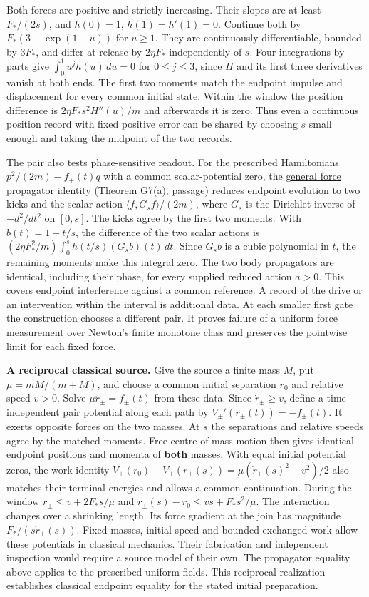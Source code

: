 \documentclass[11pt,a4paper]{article}
\begin{document}
Both forces are positive and strictly increasing. Their slopes are at
least \(F_*/(2s)\), and \(h(0)=1\), \(h(1)=h'(1)=0\). Continue both by
\(F_*(3-\exp(1-u))\) for \(u\ge1\). They are continuously
differentiable, bounded by \(3F_*\), and differ at release by
\(2\eta F_*\) independently of \(s\). Four integrations by parts give
\(\int_0^1u^j h(u)\,du=0\) for \(0\le j\le3\), since \(H\) and its first
three derivatives vanish at both ends. The first two moments match the
endpoint impulse and displacement for every common initial state. Within
the window the position difference is \(2\eta F_*s^2 H''(u)/m\) and
afterwards it is zero. Thus even a continuous position record with fixed
positive error can be shared by choosing \(s\) small enough and taking
the midpoint of the two records.

The pair also tests phase-sensitive readout. For the prescribed
Hamiltonians \(p^2/(2m)-f_\pm(t)q\) with a common scalar-potential zero,
the
\href{cut-measure-newton.md\#general-force-histories-one-dirichlet-functional}{general
force propagator identity} (Theorem G7(a), passage) reduces endpoint
evolution to two kicks and the scalar action
\(\langle f,G_s f\rangle/(2m)\), where \(G_s\) is the Dirichlet inverse
of \(-d^2/dt^2\) on \([0,s]\). The kicks agree by the first two moments.
With \(b(t)=1+t/s\), the difference of the two scalar actions is
\((2\eta F_*^2/m)\int_0^s h(t/s)(G_s b)(t)\,dt\). Since \(G_s b\) is a
cubic polynomial in \(t\), the remaining moments make this integral
zero. The two body propagators are identical, including their phase, for
every supplied reduced action \(a>0\). This covers endpoint interference
against a common reference. A record of the drive or an intervention
within the interval is additional data. At each smaller first gate the
construction chooses a different pair. It proves failure of a uniform
force measurement over Newton's finite monotone class and preserves the
pointwise limit for each fixed force.

\textbf{A reciprocal classical source.} Give the source a finite mass
\(M\), put \(\mu=mM/(m+M)\), and choose a common initial separation
\(r_0\) and relative speed \(v>0\). Solve \(\mu\ddot r_\pm=f_\pm(t)\)
from these data. Since \(\dot r_\pm\ge v\), define a time-independent
pair potential along each path by \(V_\pm'(r_\pm(t))=-f_\pm(t)\). It
exerts opposite forces on the two masses. At \(s\) the separations and
relative speeds agree by the matched moments. Free centre-of-mass motion
then gives identical endpoint positions and momenta of \textbf{both}
masses. With equal initial potential zeros, the work identity
\(V_\pm(r_0)-V_\pm(r_\pm(s))=\mu(\dot r_\pm(s)^2-v^2)/2\) also matches
their terminal energies and allows a common continuation. During the
window \(\dot r_\pm\le v+2F_*s/\mu\) and
\(r_\pm(s)-r_0\le vs+F_*s^2/\mu\). The interaction changes over a
shrinking length. Its force gradient at the join has magnitude
\(F_*/(s\dot r_\pm(s))\). Fixed masses, initial speed and bounded
exchanged work allow these potentials in classical mechanics. Their
fabrication and independent inspection would require a source model of
their own. The propagator equality above applies to the prescribed
uniform fields. This reciprocal realization establishes classical
endpoint equality for the stated initial preparation.
\end{document}
